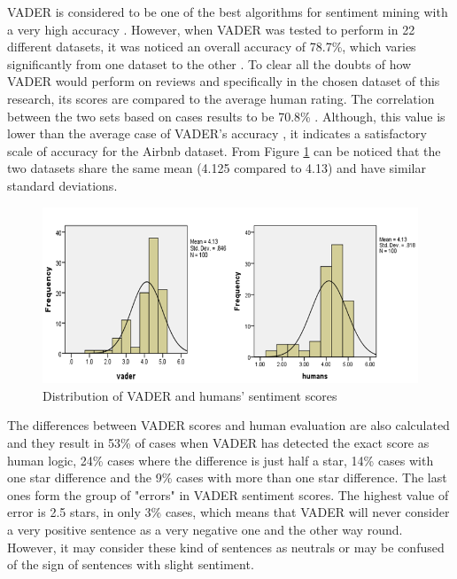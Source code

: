 VADER is considered to be one of the best algorithms for sentiment mining with a very high accuracy \cite{hutto2014vader}. However, when VADER was tested to perform in 22 different datasets, it was noticed an overall accuracy of 78.7\%, which varies significantly from one dataset to the other \cite{ribeiro2015benchmark}. To clear all the doubts of how VADER would perform on reviews and specifically in the chosen dataset of this research, its scores are compared to the average human rating. The correlation between the two sets based on cases results to be 70.8\%  . Although, this value is lower than the average case of VADER's accuracy , it indicates a satisfactory scale of accuracy for the Airbnb dataset. From Figure \ref{fig:distribution} can be noticed that the two datasets share the same mean (4.125 compared to 4.13)  and have similar standard deviations. 

\begin{figure}[h!]
	\centering
	\includegraphics[height=0.33\textheight]{graphs_vader_humans}
	\caption{Distribution of VADER and humans' sentiment scores}
	\label{fig:distribution}
\end{figure}
The differences between VADER scores and human evaluation are also calculated and they result in 53\% of cases when VADER has detected the exact score as human logic, 24\% cases where the difference is just half a star, 14\% cases with one star difference and the 9\% cases with more than one star difference. The last ones form the group of "errors" in VADER sentiment scores. The highest value of error is 2.5 stars, in only 3\% cases, which means that VADER will never consider a very positive sentence as a very negative one and the other way round. However, it may consider these kind of sentences as neutrals or may be confused of the sign of sentences with slight sentiment.

